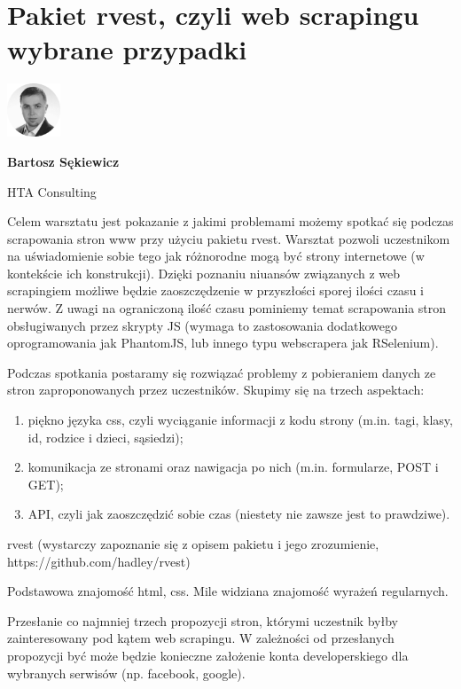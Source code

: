 \documentclass[\main/boa.tex]{subfiles}
\begin{document}
\section{Pakiet rvest, czyli web scrapingu wybrane przypadki}
\begin{minipage}[t]{0.915\textwidth}
	\center     
    \includegraphics[width=60px]{img/workshops/czarno_biale/bartosz-crop.png} 
\end{minipage}

\begin{minipage}{0.915\textwidth}
\centering
{\bf {} Bartosz Sękiewicz}
\end{minipage}

\vskip 0.3cm

\begin{affiliations}
\begin{minipage}{0.915\textwidth}
\centering
\large HTA Consulting  \\[2pt]
\end{minipage}
\end{affiliations}

\vskip 0.8cm

\opiswarsztatu Celem warsztatu jest pokazanie z jakimi problemami możemy spotkać się podczas scrapowania stron www przy użyciu pakietu rvest. Warsztat pozwoli uczestnikom na uświadomienie sobie tego jak różnorodne mogą być strony internetowe (w kontekście ich konstrukcji). Dzięki poznaniu niuansów związanych z web scrapingiem możliwe będzie zaoszczędzenie w przyszłości sporej ilości czasu i nerwów. Z uwagi na ograniczoną ilość czasu pominiemy temat scrapowania stron obsługiwanych przez skrypty JS (wymaga to zastosowania dodatkowego oprogramowania jak PhantomJS, lub innego typu webscrapera jak RSelenium).

\planwarsztatu Podczas spotkania postaramy się rozwiązać problemy z pobieraniem danych ze stron zaproponowanych przez uczestników. Skupimy się na trzech aspektach:
\begin{enumerate}
\item piękno języka css, czyli wyciąganie informacji z kodu strony (m.in. tagi, klasy, id, rodzice i dzieci, sąsiedzi);
\item komunikacja ze stronami oraz nawigacja po nich (m.in. formularze, POST i GET);
\item API, czyli jak zaoszczędzić sobie czas (niestety nie zawsze jest to prawdziwe).
\end{enumerate}	 

\pakiety rvest (wystarczy zapoznanie się z opisem pakietu i jego zrozumienie, https://github.com/hadley/rvest)

\umiejetnosci Podstawowa znajomość html, css. Mile widziana znajomość wyrażeń regularnych.

\wymagania Przesłanie co najmniej trzech propozycji stron, którymi uczestnik byłby zainteresowany pod kątem web scrapingu. W zależności od przesłanych propozycji być może będzie konieczne założenie konta developerskiego dla wybranych serwisów (np. facebook, google).
\end{document}
